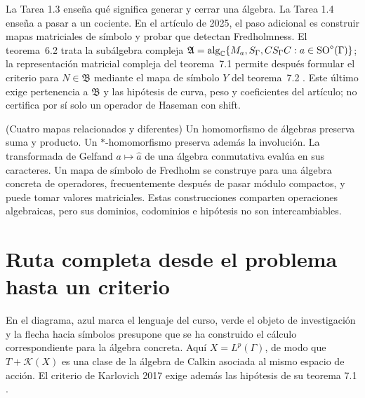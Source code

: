La Tarea 1.3 enseña qué significa generar y cerrar una álgebra. La
Tarea 1.4 enseña a pasar a un cociente. En el artículo de 2025, el
paso adicional es construir mapas matriciales de símbolo y probar
que detectan Fredholmness. El teorema~6.2 trata la subálgebra compleja
$\mathfrak A=\operatorname{alg}_{\mathbb C}
\{M_a,S_\Gamma,CS_\Gamma C:a\in\operatorname{SO}^\diamond(\Gamma)\}$;
la representación matricial compleja del teorema~7.1 permite después formular el criterio
para $N\in\mathfrak B$ mediante el mapa de símbolo $Y$ del teorema~7.2
\cite[pp.~25--26]{Karlovich2025}. Este último exige pertenencia a
$\mathfrak B$ y las hipótesis de curva, peso y coeficientes del artículo;
no certifica por sí solo un operador de Haseman con shift.

\begin{cthnota}{(Cuatro mapas relacionados y diferentes)}
Un homomorfismo de álgebras preserva suma y producto. Un
$*$-homomorfismo preserva además la involución. La transformada de
Gelfand $a\mapsto\widehat a$ de una álgebra conmutativa evalúa en sus
caracteres. Un mapa de símbolo de Fredholm se construye para una
álgebra concreta de operadores, frecuentemente después de pasar
módulo compactos, y puede tomar valores matriciales. Estas
construcciones comparten operaciones algebraicas, pero sus dominios,
codominios e hipótesis no son intercambiables.
\end{cthnota}

\section{Ruta completa desde el problema hasta un criterio}

En el diagrama, azul marca el lenguaje del curso, verde el objeto de
investigación y la flecha hacia símbolos presupone que se ha construido
el cálculo correspondiente para la álgebra concreta. Aquí
$X=L^p(\Gamma)$, de modo que $T+\mathcal K(X)$ es una clase de la
álgebra de Calkin asociada al mismo espacio de acción. El criterio de
Karlovich 2017 exige además las hipótesis de su teorema 7.1
\cite[pp.~487--489]{Karlovich2017}.

